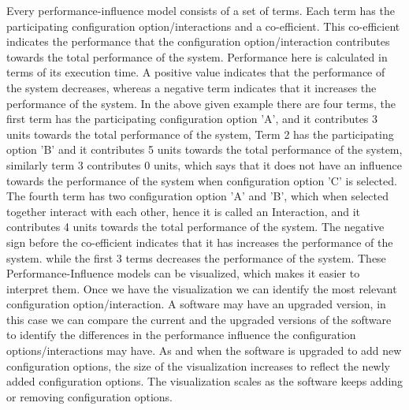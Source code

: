 Every performance-influence model consists of a set of terms. Each term has the participating configuration option/interactions and a co-efficient. This co-efficient indicates the performance that the configuration option/interaction contributes towards the total performance of the system.
Performance here is calculated in terms of its execution time. A positive value indicates that the performance of the system decreases, whereas a negative term indicates that it increases the performance of the system. In the above given example there are four terms, the first term has the participating configuration option 'A', and it contributes 3 units towards the total performance of the system, Term 2 has the participating option 'B' and it contributes 5 units towards the total performance of the system, similarly term 3 contributes 0 units, which says that it does not have an influence towards the performance of the system when configuration option 'C' is selected. The fourth term has two configuration option 'A' and 'B', which when selected together interact with each other, hence it is called an Interaction, and it contributes 4 units towards the total performance of the system. The negative sign before the co-efficient indicates that it has increases the performance of the system. while the first 3 terms decreases the performance of the system.
\newline
These Performance-Influence models can be visualized, which makes it easier to interpret them. Once we have the visualization we can identify the most relevant configuration option/interaction.
A software may have an upgraded version, in this case we can compare the current and the upgraded versions of the software to identify the differences in the performance influence the configuration options/interactions may have.
As and when the software is upgraded to add new configuration options, the size of the visualization increases to reflect the newly added configuration options. The visualization scales as the software keeps adding or removing configuration options.
                                                                       


	